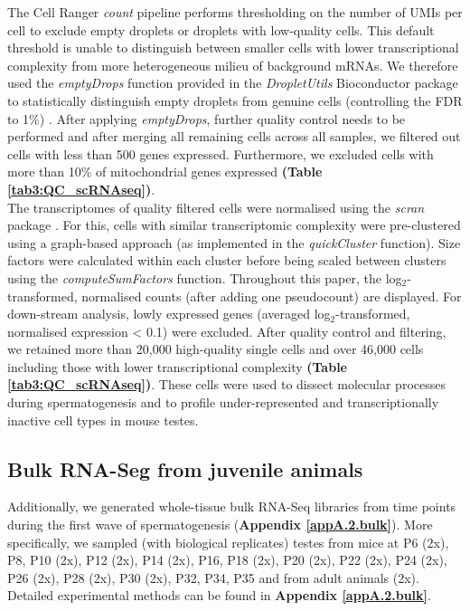 The Cell Ranger \emph{count} pipeline performs thresholding on the number of UMIs per cell to exclude empty droplets or droplets with low-quality cells. This default threshold is unable to distinguish between smaller cells with lower transcriptional complexity from more heterogeneous milieu of background mRNAs. We therefore used the \emph{emptyDrops} function provided in the \emph{DropletUtils} Bioconductor package to statistically distinguish empty droplets from genuine cells (controlling the FDR to 1\%) \citep{Lun2018}. After applying \emph{emptyDrops}, further quality control needs to be performed and after merging all remaining cells across all samples, we filtered out cells with less than 500 genes expressed. Furthermore, we excluded cells with more than 10\% of mitochondrial genes expressed \textbf{(Table \ref{tab3:QC_scRNAseq})}.\\
 
The transcriptomes of quality filtered cells were normalised using the \emph{scran} package \citep{Lun2016pooling}. For this, cells with similar transcriptomic complexity were pre-clustered using a graph-based approach (as implemented in the \emph{quickCluster} function). Size factors were
calculated within each cluster before being scaled between clusters using the \emph{computeSumFactors} function. Throughout this paper, the log$_2$-transformed, normalised counts (after adding one pseudocount) are displayed. For down-stream analysis, lowly expressed genes (averaged log$_2$-transformed, normalised expression < 0.1) were excluded. After quality control and filtering, we retained more than 20,000 high-quality single cells and over 46,000 cells including those with lower transcriptional complexity \textbf{(Table \ref{tab3:QC_scRNAseq})}. These cells were used to dissect molecular processes during spermatogenesis and to profile under-represented and transcriptionally inactive cell types in mouse testes. 

\subsection{Bulk RNA-Seg from juvenile animals}

Additionally, we generated whole-tissue bulk RNA-Seq libraries from time points during the first wave of spermatogenesis (\textbf{Appendix \ref{appA.2.bulk}}). More specifically, we sampled (with biological replicates) testes from mice at \gls{P}6 (2x), P8, P10 (2x), P12 (2x), P14 (2x), P16, P18 (2x), P20 (2x), P22 (2x), P24 (2x), P26 (2x), P28 (2x), P30 (2x), P32, P34, P35 and from adult animals (2x). Detailed experimental methods can be found in \textbf{Appendix \ref{appA.2.bulk}}. 
\\

